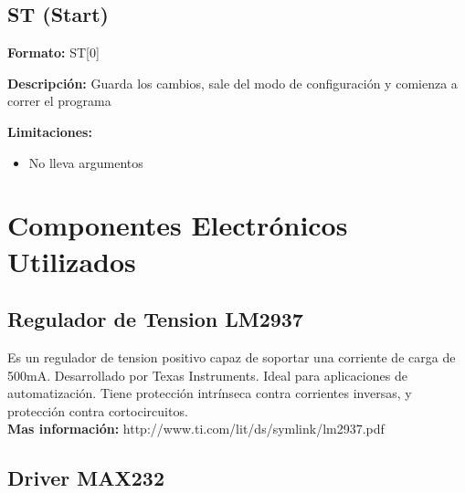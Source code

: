 \documentclass{article}
\theoremstyle{definition}
\theoremstyle{remark}
\begin{document}
\subsection{ST (Start)} %
\label{sub:st_start}


\textbf{Formato:} ST[0]

\textbf{Descripción:}
Guarda los cambios, sale del modo de configuración y comienza a correr el programa

\textbf{Limitaciones:}
\begin{itemize}
  \item No lleva argumentos
\end{itemize}




\section{Componentes Electrónicos Utilizados} %
\label{sec:componentes_electronicos_utilizados}







\subsection{Regulador de Tension LM2937} %
\label{sub:regulador_de_tension_lm2937}

Es un regulador de tension positivo capaz de soportar una corriente de carga de 500mA. Desarrollado por Texas Instruments. Ideal para aplicaciones de automatización. Tiene protección intrínseca contra corrientes inversas, y protección contra cortocircuitos. \\

\textbf{Mas información:} http://www.ti.com/lit/ds/symlink/lm2937.pdf


\subsection{Driver MAX232} %
\label{sub:driver_max232}
\end{document}
